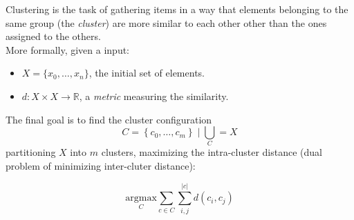 Clustering is the task of gathering items in a way that elements belonging
to the same group (the \emph{cluster}) are more similar to each other other than the ones
assigned to the others.\\
More formally, given a input:
\begin{itemize}
    \item $X = \{x_0, \dots ,x_n\}$, the initial set of elements.
    \item $d: X \times X \to \mathbb{R}$, a \emph{metric} measuring the similarity.
\end{itemize}
The final goal is to find the cluster configuration
\begin{equation*}
    C = \left\{ c_0, \dots , c_m \right\} \mid \bigcup_{C} = X
\end{equation*}
partitioning $X$ into $m$ clusters, maximizing the intra-cluster distance
(dual problem of minimizing inter-cluter distance):

\begin{equation}
    \underset{C}{\mathrm{argmax}}
    \sum_{c \in C}
        \sum_{i,j}^{|c|}
            d(c_i,c_j)
\end{equation}
